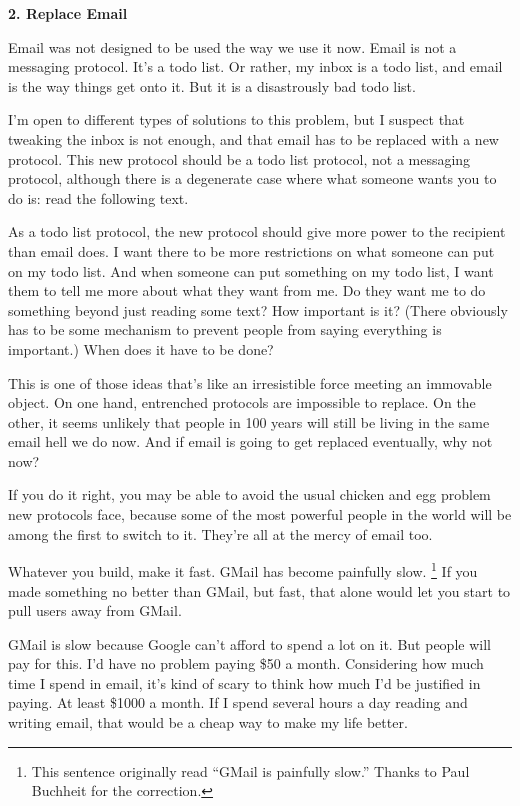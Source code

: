 \documentclass[12pt]{book}
\begin{document}
\textbf{2. Replace Email}

Email was not designed to be used the way we use it now. Email is not a
messaging protocol. It's a todo list. Or rather, my inbox is a todo
list, and email is the way things get onto it. But it is a disastrously
bad todo list.

I'm open to different types of solutions to this problem, but I suspect
that tweaking the inbox is not enough, and that email has to be replaced
with a new protocol. This new protocol should be a todo list protocol,
not a messaging protocol, although there is a degenerate case where what
someone wants you to do is: read the following text.

As a todo list protocol, the new protocol should give more power to the
recipient than email does. I want there to be more restrictions on what
someone can put on my todo list. And when someone can put something on
my todo list, I want them to tell me more about what they want from me.
Do they want me to do something beyond just reading some text? How
important is it? (There obviously has to be some mechanism to prevent
people from saying everything is important.) When does it have to be
done?

This is one of those ideas that's like an irresistible force meeting an
immovable object. On one hand, entrenched protocols are impossible to
replace. On the other, it seems unlikely that people in 100 years will
still be living in the same email hell we do now. And if email is going
to get replaced eventually, why not now?

If you do it right, you may be able to avoid the usual chicken and egg
problem new protocols face, because some of the most powerful people in
the world will be among the first to switch to it. They're all at the
mercy of email too.

Whatever you build, make it fast. GMail has become painfully slow.
\footnote{This sentence originally read ``GMail is painfully slow.''
Thanks to Paul Buchheit for the correction.} If you made something no better than GMail, but
fast, that alone would let you start to pull users away from GMail.

GMail is slow because Google can't afford to spend a lot on it. But
people will pay for this. I'd have no problem paying \$50 a month.
Considering how much time I spend in email, it's kind of scary to think
how much I'd be justified in paying. At least \$1000 a month. If I spend
several hours a day reading and writing email, that would be a cheap way
to make my life better.
\end{document}

